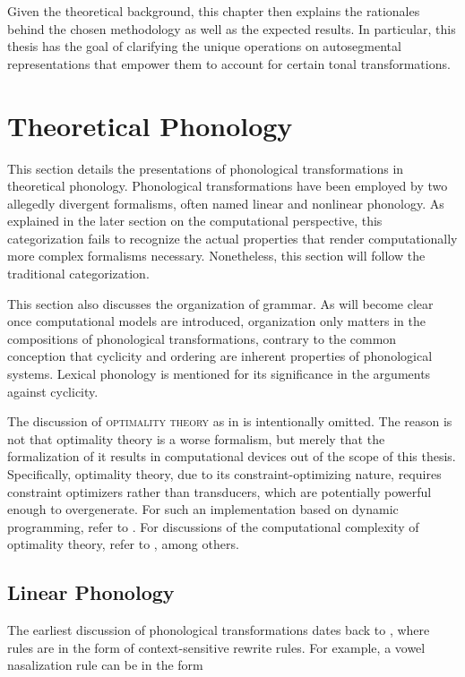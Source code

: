\documentclass[12pt, a4paper]{report}
\newcommand{\textterm}[1]{\textsc{#1}\index{#1}}
\begin{document}
Given the theoretical background, this chapter then explains the
rationales behind the chosen methodology as well as the expected
results.  In particular, this thesis has the goal of clarifying the
unique operations on autosegmental representations that empower them
to account for certain tonal transformations.

\section{Theoretical Phonology}
This section details the presentations of phonological transformations
in theoretical phonology.  Phonological transformations have been
employed by two allegedly divergent formalisms, often named linear and
nonlinear phonology.  As explained in the later section on the
computational perspective, this categorization fails to recognize the
actual properties that render computationally more complex formalisms
necessary.  Nonetheless, this section will follow the traditional
categorization.

This section also discusses the organization of grammar.  As will
become clear once computational models are introduced, organization
only matters in the compositions of phonological transformations,
contrary to the common conception that cyclicity and ordering are
inherent properties of phonological systems.  Lexical phonology is
mentioned for its significance in the arguments against cyclicity.

The discussion of \textterm{optimality theory} as in
\textcite{ps93otcigg} is intentionally omitted.  The reason is not
that optimality theory is a worse formalism, but merely that the
formalization of it results in computational devices out of the scope
of this thesis.  Specifically, optimality theory, due to its
constraint-optimizing nature, requires constraint optimizers rather
than transducers, which are potentially powerful enough to
overgenerate.  For such an implementation based on dynamic
programming, refer to \textcite{t95cot}.  For discussions of the
computational complexity of optimality theory, refer to
\textcite{e97egpot, i06sptotci, hkr09ecot}, among others.

\subsection{Linear Phonology}
The earliest discussion of phonological transformations dates back to
\textcite{ch68spe}, where rules are in the form of context-sensitive
rewrite rules.  For example, a vowel nasalization rule can be in the
form
\end{document}
